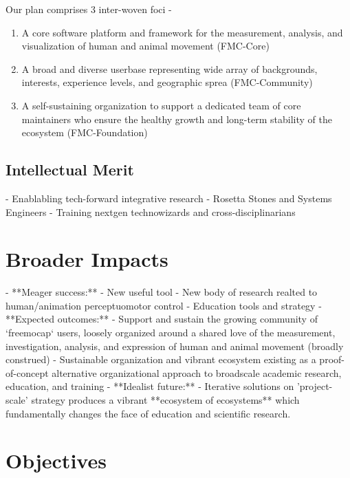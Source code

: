 \documentclass[11pt]{article}
\begin{document}

Our plan comprises 3 inter-woven foci - 
\begin{enumerate}
  \item A core software platform and framework for the measurement, analysis, and visualization of human and animal movement (FMC-Core)
  \item A broad and diverse userbase representing wide array of backgrounds, interests, experience levels, and geographic sprea (FMC-Community)
  \item A self-sustaining organization to support a dedicated team of core maintainers who ensure the healthy growth and long-term stability of the ecosystem (FMC-Foundation)
\end{enumerate}


\subsection{Intellectual Merit\label{sec:IM}}
 
- Enablabling tech-forward integrative research
- Rosetta Stones and Systems Engineers
- Training nextgen technowizards and cross-disciplinarians

\section{Broader Impacts\label{sec:BI}}
- **Meager success:**
  - New useful tool
  - New body of research realted to human/animation perceptuomotor control
  - Education tools and strategy
- **Expected outcomes:**
  - Support and sustain the growing community of `freemocap` users, loosely organized around a shared love of the measurement, investigation, analysis, and expression of human and animal movement (broadly construed) 
  - Sustainable organization and vibrant ecosystem existing as a proof-of-concept alternative organizational approach to broadscale academic research, education, and training
- **Idealist future:**
  - Iterative solutions on 'project-scale' strategy produces a vibrant **ecosystem of ecosystems** which fundamentally changes the face of education and scientific research.

\section{Objectives} 
\end{document}
